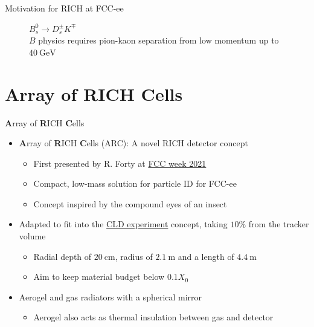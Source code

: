 \documentclass{beamer}
\begin{document}
\begin{frame}{Motivation for RICH at FCC-ee}
\begin{figure}
\begin{subfigure}{0.5\textwidth}
    \end{subfigure}
    \caption{$B_s^0\to D_s^\pm K^\mp$\\$B$ physics requires pion-kaon separation from low momentum up to $\SI{40}{\giga\eV}$}
  \end{figure}
\end{frame}

\section{\textbf{A}rray of \textbf{R}ICH \textbf{C}ells}
\begin{frame}{\textbf{A}rray of \textbf{R}ICH \textbf{C}ells}
  \begin{itemize}
    \setlength\itemsep{0.2em}
    \item{\textbf{A}rray of \textbf{R}ICH \textbf{C}ells (ARC): A novel RICH detector concept}
    \begin{itemize}
      \item{First presented by R. Forty at \href{https://indico.cern.ch/event/995850/contributions/4406336/attachments/2274813/3864163/ARC-presentation.pdf}{FCC week 2021}}
      \item{Compact, low-mass solution for particle ID for FCC-ee}
      \item{Concept inspired by the compound eyes of an insect}
    \end{itemize}
    \item{Adapted to fit into the \href{https://arxiv.org/abs/1911.12230}{CLD experiment} concept, taking $10\%$ from the tracker volume}
    \begin{itemize}
      \item{Radial depth of $\SI{20}{\centi\meter}$, radius of $\SI{2.1}{\meter}$ and a length of $\SI{4.4}{\meter}$}
      \item{Aim to keep material budget below $0.1X_0$}
    \end{itemize}
    \item{Aerogel and gas radiators with a spherical mirror}
    \begin{itemize}
      \item{Aerogel also acts as thermal insulation between gas and detector}
    \end{itemize}
  \end{itemize}
  \begin{figure}
    \centering
    \begin{subfigure}{0.4\textwidth}

\end{subfigure}
\end{figure}
\end{frame}
\end{document}
